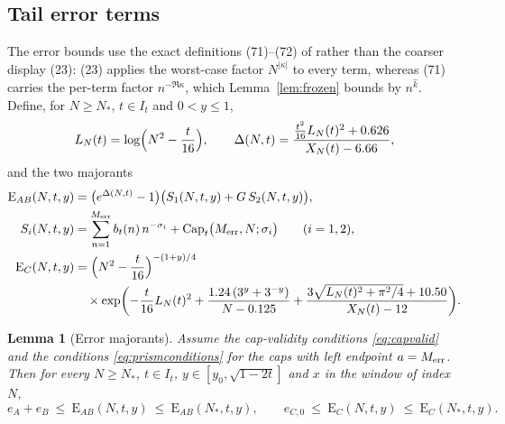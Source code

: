 \documentclass[11pt]{article}
\newtheorem{lemma}[theorem]{Lemma}
\theoremstyle{definition}
\newcommand{\CapT}{\operatorname{Cap}}
\begin{document}
\subsection{Tail error terms}\label{sec:tailerrors}

The error bounds use the exact definitions (71)--(72) of
\cite{Polymath} rather than the coarser display (23): (23) applies
the worst-case factor $N^{|\kappa|}$ to every term, whereas (71)
carries the per-term factor $n^{-\Re\kappa}$, which
Lemma~\ref{lem:frozen} bounds by $n^{\widehat k}$. Define, for
$N\ge N_*$, $t\in I_t$ and $0<y\le1$,
\[
L_N(t)=\log\Bigl(N^2-\frac t{16}\Bigr),
\qquad
\Delta(N,t)=\frac{\frac{t^2}{16}L_N(t)^2+0.626}{X_N(t)-6.66},
\]
and the two majorants
\begin{align*}
\mathrm{E}_{AB}(N,t,y)&=
\bigl(e^{\Delta(N,t)}-1\bigr)
\bigl(S_1(N,t,y)+G\,S_2(N,t,y)\bigr),
\\
S_i(N,t,y)&=\sum_{n=1}^{M_{\rm err}}b_t(n)\,n^{-\sigma_i}
+\CapT_t\bigl(M_{\rm err},N;\sigma_i\bigr)
\qquad(i=1,2),
\\
\mathrm{E}_{C}(N,t,y)&=
\Bigl(N^2-\frac t{16}\Bigr)^{-(1+y)/4}\\
&\quad\times\exp\biggl(
-\frac t{16}L_N(t)^2
+\frac{1.24\,(3^y+3^{-y})}{N-0.125}
+\frac{3\sqrt{L_N(t)^2+\pi^2/4}+10.50}{X_N(t)-12}
\biggr).
\end{align*}

\begin{lemma}[Error majorants]\label{lem:errmaj}
Assume the cap-validity conditions \eqref{eq:capvalid} and the
conditions \eqref{eq:prismconditions} for the caps with left endpoint
$a=M_{\rm err}$. Then for every $N\ge N_*$, $t\in I_t$,
$y\in[y_0,\sqrt{1-2t}]$ and $x$ in the window of index $N$,
\[
e_A+e_B\ \le\ \mathrm{E}_{AB}(N,t,y)\ \le\ \mathrm{E}_{AB}(N_*,t,y),
\qquad
e_{C,0}\ \le\ \mathrm{E}_{C}(N,t,y)\ \le\ \mathrm{E}_{C}(N_*,t,y).
\]
\end{lemma}
\end{document}
